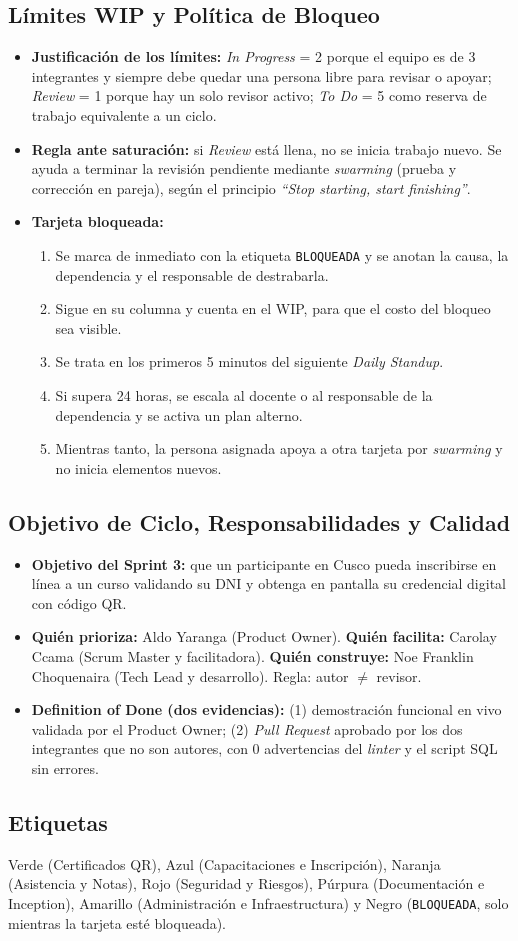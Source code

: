 \subsection{Límites WIP y Política de Bloqueo}
\begin{itemize}\setlength\itemsep{0.15em}
    \item \textbf{Justificación de los límites:} \textit{In Progress} = 2 porque el equipo es de 3 integrantes y siempre debe quedar una persona libre para revisar o apoyar; \textit{Review} = 1 porque hay un solo revisor activo; \textit{To Do} = 5 como reserva de trabajo equivalente a un ciclo.
    \item \textbf{Regla ante saturación:} si \textit{Review} está llena, no se inicia trabajo nuevo. Se ayuda a terminar la revisión pendiente mediante \textit{swarming} (prueba y corrección en pareja), según el principio \textit{``Stop starting, start finishing''}.
    \item \textbf{Tarjeta bloqueada:}
    \begin{enumerate}\setlength\itemsep{0.1em}
        \item Se marca de inmediato con la etiqueta \texttt{BLOQUEADA} y se anotan la causa, la dependencia y el responsable de destrabarla.
        \item Sigue en su columna y cuenta en el WIP, para que el costo del bloqueo sea visible.
        \item Se trata en los primeros 5 minutos del siguiente \textit{Daily Standup}.
        \item Si supera 24 horas, se escala al docente o al responsable de la dependencia y se activa un plan alterno.
        \item Mientras tanto, la persona asignada apoya a otra tarjeta por \textit{swarming} y no inicia elementos nuevos.
    \end{enumerate}
\end{itemize}

\subsection{Objetivo de Ciclo, Responsabilidades y Calidad}
\begin{itemize}\setlength\itemsep{0.15em}
    \item \textbf{Objetivo del Sprint 3:} que un participante en Cusco pueda inscribirse en línea a un curso validando su DNI y obtenga en pantalla su credencial digital con código QR.
    \item \textbf{Quién prioriza:} Aldo Yaranga (Product Owner). \textbf{Quién facilita:} Carolay Ccama (Scrum Master y facilitadora). \textbf{Quién construye:} Noe Franklin Choquenaira (Tech Lead y desarrollo). Regla: autor $\neq$ revisor.
    \item \textbf{Definition of Done (dos evidencias):} (1) demostración funcional en vivo validada por el Product Owner; (2) \textit{Pull Request} aprobado por los dos integrantes que no son autores, con 0 advertencias del \textit{linter} y el script SQL sin errores.
\end{itemize}

\subsection{Etiquetas}
Verde (Certificados QR), Azul (Capacitaciones e Inscripción), Naranja (Asistencia y Notas), Rojo (Seguridad y Riesgos), Púrpura (Documentación e Inception), Amarillo (Administración e Infraestructura) y Negro (\texttt{BLOQUEADA}, solo mientras la tarjeta esté bloqueada).
